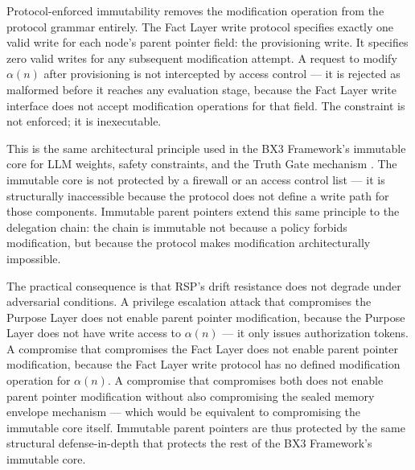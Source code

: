 Protocol-enforced immutability removes the modification operation from the protocol grammar entirely. The Fact Layer write protocol specifies exactly one valid write for each node's parent pointer field: the provisioning write. It specifies zero valid writes for any subsequent modification attempt. A request to modify $\alpha(n)$ after provisioning is not intercepted by access control — it is rejected as malformed before it reaches any evaluation stage, because the Fact Layer write interface does not accept modification operations for that field. The constraint is not enforced; it is inexecutable.

This is the same architectural principle used in the BX3 Framework's immutable core for LLM weights, safety constraints, and the Truth Gate mechanism \cite{bx3whitepaper2026}. The immutable core is not protected by a firewall or an access control list — it is structurally inaccessible because the protocol does not define a write path for those components. Immutable parent pointers extend this same principle to the delegation chain: the chain is immutable not because a policy forbids modification, but because the protocol makes modification architecturally impossible.

The practical consequence is that RSP's drift resistance does not degrade under adversarial conditions. A privilege escalation attack that compromises the Purpose Layer does not enable parent pointer modification, because the Purpose Layer does not have write access to $\alpha(n)$ — it only issues authorization tokens. A compromise that compromises the Fact Layer does not enable parent pointer modification, because the Fact Layer write protocol has no defined modification operation for $\alpha(n)$. A compromise that compromises both does not enable parent pointer modification without also compromising the sealed memory envelope mechanism — which would be equivalent to compromising the immutable core itself. Immutable parent pointers are thus protected by the same structural defense-in-depth that protects the rest of the BX3 Framework's immutable core.

